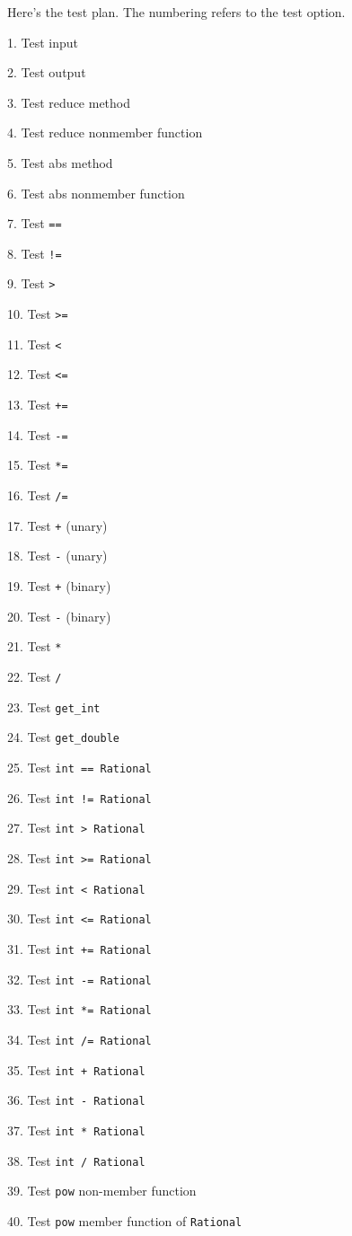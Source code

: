 {Here's the test plan. The numbering refers to the test option.
\begin{tightlist}
\item[1.] Test input
\item[2.] Test output
\item[3.] Test reduce method
\item[4.] Test reduce nonmember function
\item[5.] Test abs method
\item[6.] Test abs nonmember function
\item[7.] Test \texttt{==}
\item[8.] Test \texttt{!=}
\item[9.] Test \texttt{>}
\item[10.] Test \texttt{>=}
\item[11.] Test \texttt{<}
\item[12.] Test \texttt{<=}
\item[13.] Test \texttt{+=}
\item[14.] Test \texttt{-=}
\item[15.] Test \texttt{*=}
\item[16.] Test \texttt{/=}
\item[17.] Test \texttt{+} (unary)
\item[18.] Test \texttt{-} (unary)
\item[19.] Test \texttt{+} (binary)
\item[20.] Test \texttt{-} (binary)
\item[21.] Test \texttt{*}
\item[22.] Test \texttt{/}
\item[23.] Test \texttt{get\_int}
\item[24.] Test \texttt{get\_double}
\item[25.] Test \texttt{int == Rational}
\item[26.] Test \texttt{int != Rational}
\item[27.] Test \texttt{int > Rational}
\item[28.] Test \texttt{int >= Rational}
\item[29.] Test \texttt{int < Rational}
\item[30.] Test \texttt{int <= Rational}
\item[31.] Test \texttt{int += Rational}
\item[32.] Test \texttt{int -= Rational}
\item[33.] Test \texttt{int *= Rational}
\item[34.] Test \texttt{int /= Rational}
\item[35.] Test \texttt{int + Rational}
\item[36.] Test \texttt{int - Rational}
\item[37.] Test \texttt{int * Rational}
\item[38.] Test \texttt{int / Rational}
\item[39.] Test \texttt{pow} non-member function
\item[40.] Test \texttt{pow} member function of \texttt{Rational}
\end{tightlist}


}
